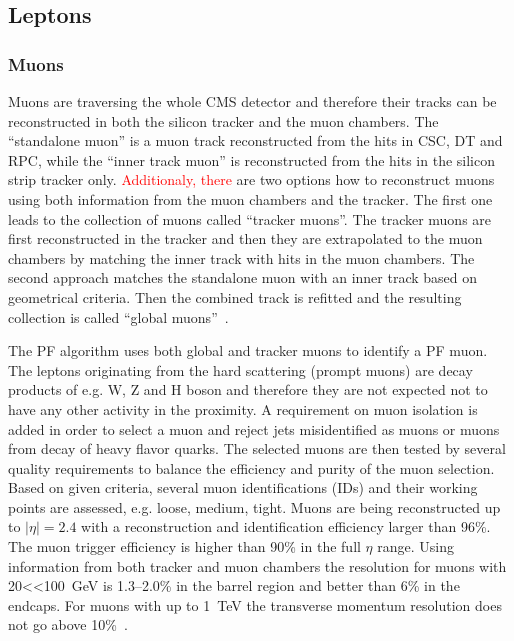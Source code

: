 
\subsection{Leptons}

\subsubsection{Muons}

Muons are traversing the whole CMS detector and therefore their tracks can be reconstructed in both the silicon tracker and the muon chambers. The ``standalone muon'' is a muon track reconstructed from the hits in CSC, DT and RPC, while the ``inner track muon'' is reconstructed from the hits in the silicon strip tracker only. \textcolor{red}{Additionaly, there} are two options how to reconstruct muons using both information from the muon chambers and the tracker. The first one leads to the collection of muons called ``tracker muons''.  The tracker muons are first reconstructed in the tracker and then they are extrapolated to the muon chambers by matching the inner track with hits in the muon chambers. The second approach matches the standalone muon with an inner track based on geometrical criteria. Then the combined track is refitted and the resulting collection is called ``global muons''~\cite{Chatrchyan:2012xi}. 

The PF algorithm uses both global and tracker muons to identify a PF muon. The leptons originating from the hard scattering (prompt muons)  are decay products of e.g. W, Z and H boson and therefore they are not expected not to have any other activity in the proximity. A requirement on muon isolation is added in order to select a muon and reject jets misidentified as muons or muons from decay of heavy flavor quarks. The selected muons are then tested by several quality requirements to balance the efficiency and purity of the muon selection. Based on given criteria, several muon identifications (IDs) and their working points are assessed, e.g. loose, medium, tight. Muons are being reconstructed up to $|\eta|=2.4$ with a reconstruction and identification efficiency larger than 96\%. The muon trigger efficiency is higher than 90\% in  the full $\eta$ range. Using information from both tracker and muon chambers the \pt resolution for muons with 20<\pt<100~GeV is 1.3--2.0\% in the barrel region and better than 6\% in the endcaps. For muons with \pt up to 1~TeV the transverse momentum resolution does not go above 10\%~\cite{Chatrchyan:2012xi}.

